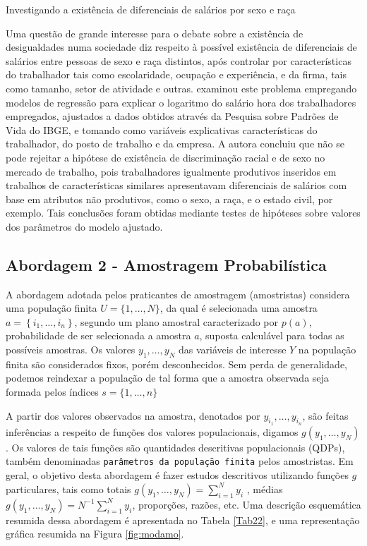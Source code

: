 \documentclass[]{book}
\numberwithin{example}{chapter}
\numberwithin{remark}{chapter}
\numberwithin{definition}{chapter}
\begin{document}
Investigando a existência de diferenciais de salários por sexo e raça

Uma questão de grande interesse para o debate sobre a existência de
desigualdades numa sociedade diz respeito à possível existência de
diferenciais de salários entre pessoas de sexo e raça distintos, após
controlar por características do trabalhador tais como escolaridade,
ocupação e experiência, e da firma, tais como tamanho, setor de
atividade e outras. \citep{Rodrigues} examinou este problema empregando
modelos de regressão para explicar o logaritmo do salário hora dos
trabalhadores empregados, ajustados a dados obtidos através da Pesquisa
sobre Padrões de Vida do IBGE, e tomando como variáveis explicativas
características do trabalhador, do posto de trabalho e da empresa. A
autora concluiu que não se pode rejeitar a hipótese de existência de
discriminação racial e de sexo no mercado de trabalho, pois
trabalhadores igualmente produtivos inseridos em trabalhos de
características similares apresentavam diferenciais de salários com base
em atributos não produtivos, como o sexo, a raça, e o estado civil, por
exemplo. Tais conclusões foram obtidas mediante testes de hipóteses
sobre valores dos parâmetros do modelo ajustado.

\subsection{Abordagem 2 - Amostragem
Probabilística}\label{abordagem-2---amostragem-probabilistica}

A abordagem adotada pelos praticantes de amostragem (amostristas)
considera uma população finita \(U=\{1,\ldots ,N\}\), da qual é
selecionada uma amostra \(a=\left\{ i_{1},\ldots ,i_{n}\right\}\),
segundo um plano amostral caracterizado por \(p\left( a\right)\),
probabilidade de ser selecionada a amostra \(a\), suposta calculável
para todas as possíveis amostras. Os valores \(y_{1},\ldots ,y_{N}\) das
variáveis de interesse \(Y\) na população finita são considerados fixos,
porém desconhecidos. Sem perda de generalidade, podemos reindexar a
população de tal forma que a amostra observada seja formada pelos
índices \(s=\{1,\ldots,n\}\) \textbar{}

A partir dos valores observados na amostra, denotados por
\(y_{i_{1}},\ldots,y_{i_{n}}\), são feitas inferências a respeito de
funções dos valores populacionais, digamos
\(g\left( y_{1},\ldots ,y_{N}\right)\). Os valores de tais funções são
quantidades descritivas populacionais (QDPs), também denominadas
\texttt{parâmetros\ da\ população\ finita} pelos amostristas. Em geral,
o objetivo desta abordagem é fazer estudos descritivos utilizando
funções \(g\) particulares, tais como totais
\(g\left( y_{1},\ldots ,y_{N}\right) =\sum_{i=1}^{N}y_{i}\) , médias
\(g\left( y_{1},\ldots ,y_{N}\right) =N^{-1}\sum_{i=1}^{N}y_{i}\),
proporções, razões, etc. Uma descrição esquemática resumida dessa
abordagem é apresentada no Tabela \ref{Tab22}, e uma representação
gráfica resumida na Figura \ref{fig:modamo}.
\end{document}

